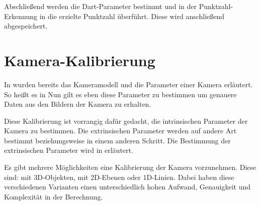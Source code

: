 Abschließend werden die Dart-Parameter bestimmt und in der Punktzahl-Erkennung in die erzielte Punktzahl überführt. Diese wird anschließend abgespeichert.


\section{Kamera-Kalibrierung}
\label{sec:camera}
In  wurden bereits das Kameramodell und die Parameter einer Kamera erläutert. So heißt es in \autocite[5]{Zhang2000}  Nun gilt es eben diese Parameter zu bestimmen um genauere Daten aus den Bildern der Kamera zu erhalten. 

Diese Kalibrierung ist vorrangig dafür gedacht, die intrinsischen Parameter der Kamera zu bestimmen. Die extrinsischen Parameter werden auf andere Art bestimmt beziehungsweise in einem anderen Schritt. Die Bestimmung der extrinsischen Parameter wird in  erläutert.

Es gibt mehrere Möglichkeiten eine Kalibrierung der Kamera vorzunehmen. Diese sind: mit 3D-Objekten, mit 2D-Ebenen oder 1D-Linien. Dabei haben diese verschiedenen Varianten einen unterschiedlich hohen Aufwand, Genauigkeit und Komplexität in der Berechnung. 

